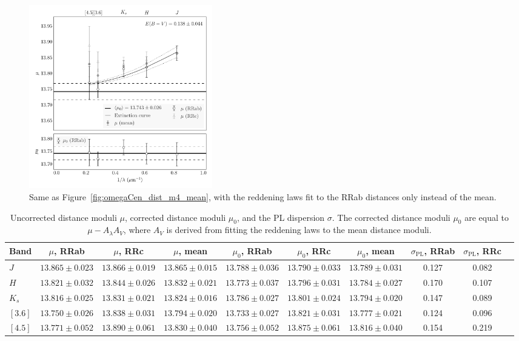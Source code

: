 \documentclass[a4paper,fleqn,usenatbib]{mnras}
\begin{document}
\begin{figure}
\begin{center}
\includegraphics[width=80mm, trim=0.75cm 0 0.5cm 0]{reworked_fitting_code/final_plots/multiwavelength_distance_m4_clipped_ab.pdf}
\caption{Same as Figure~\ref{fig:omegaCen_dist_m4_mean}, with the reddening laws fit to the RRab distances only instead of the mean.}
\label{fig:omegaCen_dist_m4_ab}
\end{center}
\end{figure}

\begingroup
\setlength{\tabcolsep}{.5em}

\begin{table}
\centering
\caption{Uncorrected distance moduli $\mu$, corrected distance moduli $\mu_0$, and the PL dispersion $\sigma$. The corrected distance moduli $\mu_0$ are equal to $\mu - A_\lambda A_V$, where $A_V$ is derived from fitting the reddening laws to the mean distance moduli.}
\label{tab:dist_mod}
\begin{tabular}{l||c|c|c|c|c|c|c|c|r} 
\hline \hline
Band & $\mu$, RRab & $\mu$, RRc & $\mu$, mean & $\mu_0$, RRab & $\mu_0$, RRc & $\mu_0$, mean & $\sigma_{\text{PL}}$, RRab & $\sigma_{\text{PL}}$, RRc \\
\hline
$J$ & $13.865 \pm 0.023$ & $13.866 \pm 0.019$ & $13.865 \pm 0.015$ & $13.788 \pm 0.036$ & $13.790 \pm 0.033$ & $13.789 \pm 0.031$ & 0.127 & 0.082 \\
$H$ & $13.821 \pm 0.032$ & $13.844 \pm 0.026$ & $13.832 \pm 0.021$ & $13.773 \pm 0.037$ & $13.796 \pm 0.031$ & $13.784 \pm 0.027$ & 0.170 & 0.107 \\
$K_s$ & $13.816 \pm 0.025$ & $13.831 \pm 0.021$ & $13.824 \pm 0.016$ & $13.786 \pm 0.027$ & $13.801 \pm 0.024$ & $13.794 \pm 0.020$ & 0.147 & 0.089 \\
$[3.6]$ & $13.750 \pm 0.026$ & $13.838 \pm 0.031$ & $13.794 \pm 0.020$ & $13.733 \pm 0.027$ & $13.821 \pm 0.031$ & $13.777 \pm 0.021$ & 0.124 & 0.096 \\
$[4.5]$ & $13.771 \pm 0.052$ & $13.890 \pm 0.061$ & $13.830 \pm 0.040$ & $13.756 \pm 0.052$ & $13.875 \pm 0.061$ & $13.816 \pm 0.040$ & 0.154 & 0.219 \\
\hline
\end{tabular}
\end{table}
\end{document}

